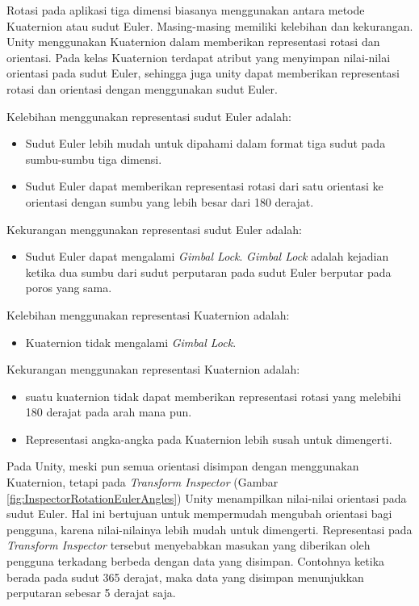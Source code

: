  Rotasi pada aplikasi tiga dimensi biasanya menggunakan antara metode Kuaternion atau sudut Euler. Masing-masing memiliki kelebihan dan kekurangan. Unity menggunakan Kuaternion dalam memberikan representasi rotasi dan orientasi. Pada kelas Kuaternion terdapat atribut yang menyimpan nilai-nilai orientasi pada sudut Euler, sehingga juga unity dapat memberikan representasi rotasi dan orientasi dengan menggunakan sudut Euler.
 
 Kelebihan menggunakan representasi sudut Euler adalah:
 \begin{itemize}
     \item Sudut Euler lebih mudah untuk dipahami dalam format tiga sudut pada sumbu-sumbu tiga dimensi.
     \item Sudut Euler dapat memberikan representasi rotasi dari satu orientasi ke orientasi dengan sumbu yang lebih besar dari 180 derajat. 
 \end{itemize}
 Kekurangan menggunakan representasi sudut Euler adalah:
 \begin{itemize}
     \item Sudut Euler dapat mengalami \textit{Gimbal Lock}. \textit{Gimbal Lock} adalah kejadian ketika dua sumbu dari sudut perputaran pada sudut Euler berputar pada poros yang sama.
 \end{itemize}
 
 Kelebihan menggunakan representasi Kuaternion adalah:
 \begin{itemize}
     \item Kuaternion tidak mengalami \textit{Gimbal Lock}.
 \end{itemize}
 Kekurangan menggunakan representasi Kuaternion adalah:
 \begin{itemize}
     \item suatu kuaternion tidak dapat memberikan representasi rotasi yang melebihi 180 derajat pada arah mana pun.
     \item Representasi angka-angka pada Kuaternion lebih susah untuk dimengerti.
 \end{itemize}
 
 Pada Unity, meski pun semua orientasi disimpan dengan menggunakan Kuaternion, tetapi pada \textit{Transform Inspector} (Gambar \ref{fig:InspectorRotationEulerAngles}) Unity menampilkan nilai-nilai orientasi pada sudut Euler. Hal ini bertujuan untuk mempermudah mengubah orientasi bagi pengguna, karena nilai-nilainya lebih mudah untuk dimengerti. Representasi pada \textit{Transform Inspector} tersebut menyebabkan masukan yang diberikan oleh pengguna terkadang berbeda dengan data yang disimpan. Contohnya ketika berada pada sudut 365 derajat, maka data yang disimpan menunjukkan perputaran sebesar 5 derajat saja.
 
